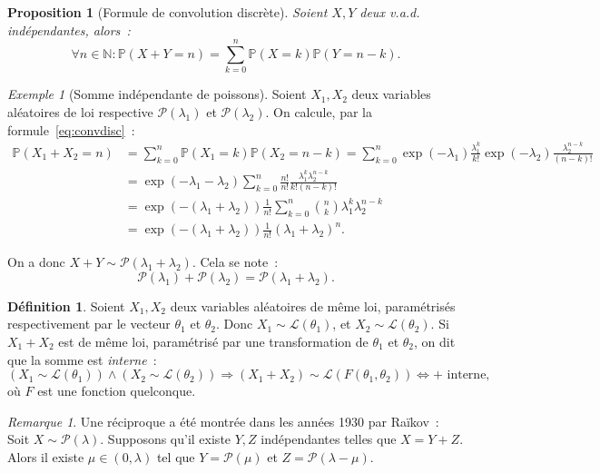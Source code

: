 \documentclass{article}
\newcommand{\N}{\mathbb N}
\renewcommand{\P}{\mathbb P}
\newtheorem{prp}[thm]{Proposition}
\theoremstyle{definition}
\newtheorem{déf}[thm]{Définition}
\theoremstyle{remark}
\newtheorem*{rmq}{Remarque}
\newtheorem{ex}{Exemple}
\begin{document}
		\begin{prp}[Formule de convolution discrète] Soient $X, Y$ deux v.a.d. indépendantes, alors~:
		\begin{equation}\label{eq:convdisc}
			\forall n \in \N : \P(X+Y=n) = \sum_{k=0}^n\P(X=k)\P(Y=n-k).
		\end{equation}
		\end{prp}

		\begin{ex}[Somme indépendante de poissons] Soient $X_1, X_2$ deux variables aléatoires de loi respective $\mathcal P(\lambda_1)$ et $\mathcal P(\lambda_2)$.
		On calcule, par la formule~\eqref{eq:convdisc}~:
		\begin{align*}
			\P(X_1+X_2 = n) &= \sum_{k=0}^n\P(X_1=k)\P(X_2=n-k) = \sum_{k=0}^n\exp(-\lambda_1)\frac {\lambda_1^k}{k!}\exp(-\lambda_2)\frac {\lambda_2^{n-k}}{(n-k)!} \\
			                &= \exp(-\lambda_1-\lambda_2)\sum_{k=0}^n\frac {n!}{n!}\frac {\lambda_1^k\lambda_2^{n-k}}{k!(n-k)!} \\
							&= \exp\left(-(\lambda_1+\lambda_2)\right)\frac 1{n!}\sum_{k=0}^n\binom nk\lambda_1^k\lambda_2^{n-k} \\
							&= \exp\left(-(\lambda_1+\lambda_2)\right)\frac 1{n!}(\lambda_1 + \lambda_2)^n.
		\end{align*}

		On a donc $X+Y \sim \mathcal P(\lambda_1 + \lambda_2)$. Cela se note~:
		\[\mathcal P(\lambda_1) + \mathcal P(\lambda_2) = \mathcal P(\lambda_1+\lambda_2).\]
		\end{ex}

		\begin{déf} Soient $X_1, X_2$ deux variables aléatoires de même loi, paramétrisés respectivement par le vecteur $\theta_1$ et $\theta_2$. Donc
		$X_1 \sim \mathcal L(\theta_1)$, et $X_2 \sim \mathcal L(\theta_2)$. Si $X_1 + X_2$ est de même loi, paramétrisé par une transformation de $\theta_1$
		et $\theta_2$, on dit que la somme est \emph{interne}~:
		\[(X_1 \sim \mathcal L(\theta_1)) \land (X_2 \sim \mathcal L(\theta_2)) \Rightarrow (X_1 + X_2) \sim \mathcal L(F(\theta_1, \theta_2)) \iff + \text{ interne},\]
		où $F$ est une fonction quelconque. \end{déf}

		\begin{rmq} Une réciproque a été montrée dans les années 1930 par Raïkov~: Soit $X \sim \mathcal P(\lambda)$. Supposons qu'il existe $Y, Z$ indépendantes
		telles que $X = Y+Z$. Alors il existe $\mu \in (0, \lambda)$ tel que $Y = \mathcal P(\mu)$ et $Z = \mathcal P(\lambda-\mu)$. \end{rmq}
\end{document}
